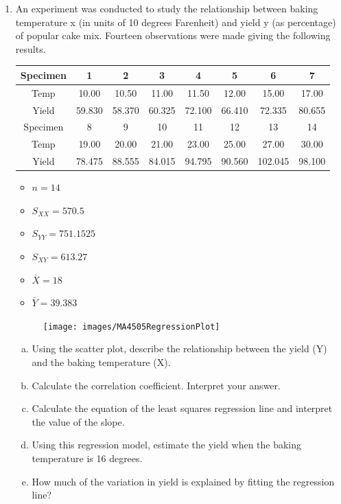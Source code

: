 \documentclass[a4paper,12pt]{article}
\begin{document}
\begin{enumerate}

\item An experiment was conducted to study the relationship between baking temperature x (in units of 10 degrees Farenheit) and yield y (as percentage) of popular cake mix. Fourteen observations were made giving the following results.





\begin{center}
	\begin{tabular}{|c||c|c|c|c|c|c|c|}
		\hline
		Specimen & 1 & 2 & 3 & 4 & 5 & 6 & 7 \\ \hline
		\hline
		Temp &  10.00 & 10.50 & 11.00 & 11.50 & 12.00 & 15.00 & 17.00 \\ \hline 
		Yield &  59.830&  58.370 & 60.325 &72.100 &66.410 &72.335 & 80.655 \\ \hline 
		\hline\hline
		Specimen & 8 & 9 & 10 & 11 & 12 & 13 & 14 \\  \hline
		Temp &  19.00 & 20.00 & 21.00 & 23.00 & 25.00 & 27.00 & 30.00 \\ \hline
		Yield &  78.475& 88.555&  84.015 & 94.795 & 90.560&  102.045 & 98.100 \\ \hline 
		\hline
	\end{tabular}
\end{center}

\begin{multicols}{3}
	\begin{itemize}
		\item $n=14$
		\item $S_{XX} = 570.5$
		\item $S_{YY} =  751.1525$
		\item $S_{XY} = 613.27$
		\item $\bar{X} = 18$
		\item $\bar{Y} = 39.383$
	\end{itemize}
\end{multicols}

\begin{figure}[h!]
	\centering
	\texttt{[image: images/MA4505RegressionPlot]}
\end{figure}
\medskip
\begin{enumerate}[(a)]
	\item Using the scatter plot, describe the relationship between the yield (Y) and the baking temperature (X).
	\item Calculate the correlation coefficient. Interpret your answer.
	\item Calculate the equation of the least squares regression line and interpret the value of the slope.
	\item Using this regression model, estimate the yield when the baking temperature is 16 degrees.
	\item How much of the variation in yield is explained by fitting the regression line?
\end{enumerate} %




\end{enumerate}
\end{document}
